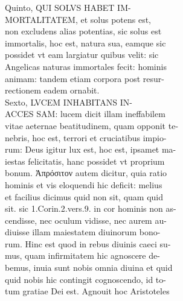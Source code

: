 \documentclass{article}
\begin{document}
\begin{pages}
                Quinto, QUI SOLVS HABET IM- \\
                MORTALITATEM, et solus potens est, \\
                non excludens alias potentias, sic solus est \\
                immortalis, hoc est, natura sua, eamque sic \\
                possidet vt eam largiatur quibus velit: sic \\
                Angelicas naturas immortales fecit: hominis \\
                animam: tandem etiam corpora post resur- \\
                rectionem eadem ornabit. \\
                Sexto, LVCEM INHABITANS IN- \\
                ACCES SAM: lucem dicit illam ineffabilem \\
                vitae aeternae beatitudinem, quam opponit te- \\
                nebris, hoc est, terrori et cruciatibus impio- \\
                rum: Deus igitur lux est, hoc est, ipsamet ma- \\
                iestas felicitatis, hanc possidet vt proprium \\
                bonum. Ἀπρόσιτον autem dicitur, quia ratio \\
                hominis et vis eloquendi hic deficit: melius \\
                et facilius dicimus quid non sit, quam quid \\
                sit. sic 1.Corin.2.vers.9. in cor hominis non as- \\
                cendisse, nec oculum vidisse, nec aurem au- \\
                diuisse illam maiestatem diuinorum bono- \\
                rum. Hinc est quod in rebus diuinis caeci su- \\
                mus, quam infirmitatem hic agnoscere de- \\
                bemus, inuia sunt nobis omnia diuina et quid \\
                quid nobis hic contingit cognoscendo, id to- \\
                tum gratiae Dei est. Agnouit hoc Aristoteles \\

\end{pages}
\end{document}
